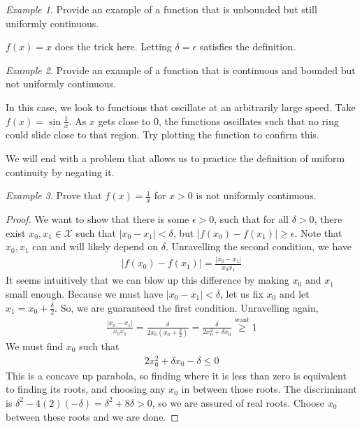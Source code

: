 \documentclass[11pt]{article}
\newcommand{\X}{\ensuremath{\mathcal X}}
\newcommand{\e}{\epsilon}
\theoremstyle{plain}
\theoremstyle{definition}
\theoremstyle{remark}
\newtheorem{exm}{Example}[section]
\begin{document}
\begin{exm}
    Provide an example of a function that is unbounded but still uniformly continuous.
\end{exm}
$f(x) = x$ does the trick here. Letting $\delta = \e$ satisfies the definition.
\begin{exm}
    Provide an example of a function that is continuous and bounded but not uniformly continuous.
\end{exm}
In this case, we look to functions that oscillate at an arbitrarily large speed. Take $f(x) = \sin \frac{1}{x}$. As $x$ gets close to 0, the functions oscillates such that no ring could slide close to that region. Try plotting the function to confirm this.

We will end with a problem that allows us to practice the definition of uniform continuity by negating it.
\begin{exm}
    Prove that $f(x) = \frac{1}{x}$ for $x > 0$ is not uniformly continuous.
\end{exm}
\begin{proof}
    We want to show that there is some $\e > 0$, such that for all $\delta > 0$, there exist $x_0, x_1 \in \X$ such that $|x_0 - x_1| < \delta$, but $|f(x_0) - f(x_1)| \geq \e$. Note that $x_0, x_1$ can and will likely depend on $\delta$. Unravelling the second condition, we have
    \begin{align*}
        |f(x_0) - f(x_1)| = \frac{|x_0 - x_1|}{x_0 x_1}
    \end{align*}
    It seems intuitively that we can blow up this difference by making $x_0$ and $x_1$ small enough. Because we must have $|x_0 - x_1| < \delta$, let us fix $x_0$ and let $x_1 = x_0 + \frac{\delta}{2}$. So, we are guaranteed the first condition. Unravelling again,
    \begin{align*}
        \frac{|x_0 - x_1|}{x_0 x_1} = \frac{\delta}{2x_0(x_0 + \frac{\delta}{2})} = \frac{\delta}{2x_0^2 + \delta x_0} \overset{\text{want}}{\geq} 1
    \end{align*}
    We must find $x_0$ such that
    \begin{align*}
        2x_0^2 + \delta x_0 - \delta \leq 0
    \end{align*}
    This is a concave up parabola, so finding where it is less than zero is equivalent to finding its roots, and choosing any $x_0$ in between those roots. The discriminant is $\delta^2 - 4(2)(-\delta) = \delta^2 + 8\delta > 0$, so we are assured of real roots. Choose $x_0$ between these roots and we are done.
\end{proof}
\end{document}
